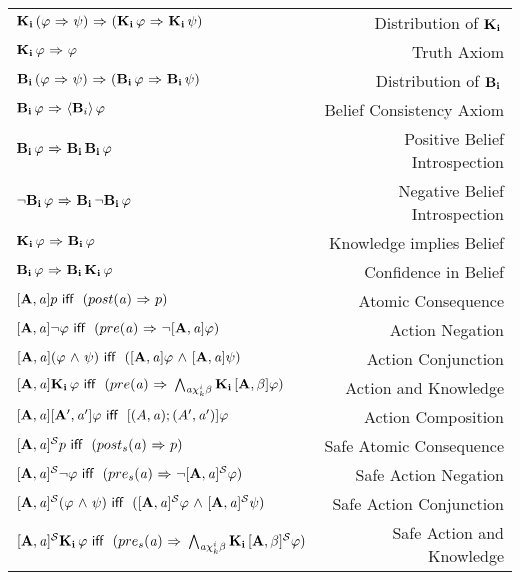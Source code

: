 \begin{table}[H]
\begin{center}
\begin{tabular}{| l r |}
	\hline
    $\Kns{i}(\varphi \iimplies \psi) \iimplies (\Kns{i}\varphi \iimplies \Kns{i}\psi)$ & Distribution of $\Kns{i}$ \\
    $\Kns{i}\varphi \iimplies \varphi$ & Truth Axiom \\
    $\Bels{i}(\varphi \iimplies \psi) \iimplies (\Bels{i}\varphi \iimplies \Bels{i}\psi)$ & Distribution of $\Bels{i}$\\
    $\Bels{i}\varphi \iimplies \BPoss{i}\varphi$ & Belief Consistency Axiom\\
    $\Bels{i}\varphi \iimplies \Bels{i}\Bels{i}\varphi$ & Positive Belief Introspection \\
    $\tlnot\Bels{i}\varphi \iimplies \Bels{i}\tlnot\Bels{i}\varphi$ & Negative Belief Introspection\\
    $\Kns{i}\varphi \iimplies \Bels{i}\varphi$ & Knowledge implies Belief \\
    $\Bels{i}\varphi \iimplies \Bels{i}\Kns{i}\varphi$ & Confidence in Belief\\
    $\Pal{A,\laa}p \iiff (post(\laa) \iimplies p)$ & Atomic Consequence\\
    $\Pal{A,\laa}\tlnot \varphi \iiff (pre(\laa) \iimplies \tlnot \Pal{A,\laa}\varphi)$ & Action Negation\\
    $\Pal{A,\laa}(\varphi \tland \psi) \iiff (\Pal{A,\laa}\varphi \tland \Pal{A,\laa}\psi)$ & Action Conjunction\\
    $\Pal{A,\laa}\Kns{i}\varphi \iiff (pre(\laa)\iimplies \bigwedge_{\laa\chi_{k}^i\beta}\Kns{i}\Pal{A,\beta}\varphi)$ & Action and Knowledge\\
    $\Pal{A,\laa}\Pal{A',\laa'}\varphi \iiff [(A,\laa);(A',\laa')]\varphi$ & Action Composition \\
    $\SPal{A,\laa}p \iiff (post_s(\laa) \iimplies p)$ & Safe Atomic Consequence\\
    $\SPal{A,\laa}\tlnot \varphi \iiff (pre_s(\laa) \iimplies \tlnot \SPal{A,\laa}\varphi)$ & Safe Action Negation\\
    $\SPal{A,\laa}(\varphi \tland \psi) \iiff (\SPal{A,\laa}\varphi \tland \SPal{A,\laa}\psi)$ & Safe Action Conjunction\\
    $\SPal{A,\laa}\Kns{i}\varphi \iiff (pre_s(\laa)\iimplies \bigwedge_{\laa\chi_{k}^i\beta}\Kns{i}\SPal{A,\beta}\varphi)$ & Safe Action and Knowledge\\

\end{tabular}
\end{center}
\end{table}
